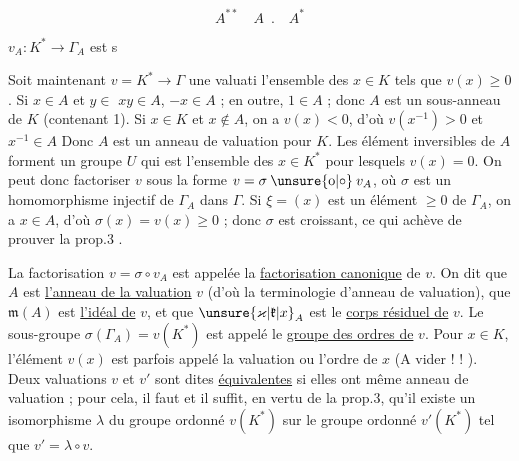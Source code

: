 
\[
A^{**}\quad A\enspace .\quad A^*
\]




$v_A:K^*\longrightarrow\Gamma_A$ est s

Soit maintenant $v=K^*\longrightarrow\Gamma$ une valuati l'ensemble des $x\in K$ tels que $v(x)\geqslant0$. Si $x\in A$ et $y\in$  $xy\in A$, $-x\in A$ ; en outre, $1\in A$ ; donc $A$ est un sous-anneau de $K$ (contenant 1). Si $x\in K$ et $x\notin A$, on a $v(x)<0$, d'où $v(x^{-1})>0$ et $x^{-1}\in A$ Donc $A$ est un anneau de valuation pour $K$. Les élément inversibles de $A$ forment un groupe $U$ qui est l'ensemble des $x\in K^*$ pour lesquels $v(x)=0$. On peut donc factoriser $v$ sous la forme $v=\sigma\mathbin{\unsure{\mathrm{o}|\circ}}v_A$, où $\sigma$ est un homomorphisme injectif de $\Gamma_A$ dans $\Gamma$. Si $\xi=(x)$ est un élément $\geqslant0$ de $\Gamma_A$, on a $x\in A$, d'où $\sigma(x)=v(x)\geqslant0$ ; donc $\sigma$ est croissant, ce qui achève de prouver la prop.3 .

La factorisation $v=\sigma\circ v_A$ est appelée la \uline{factorisation canonique} de $v$. On dit que $A$ est \uline{l'anneau de la valuation} $v$ (d'où la terminologie d'anneau de valuation), que $\mathfrak{m}(A)$ est \uline{l'idéal de} $v$, et que $\unsure{\varkappa|\mathfrak{k}|x}_A$ est le \uline{corps résiduel de} $v$. Le sous-groupe $\sigma(\Gamma_A)=v(K^*)$ est appelé le \uline{groupe des ordres de} $v$. Pour $x\in K$, l'élément $v(x)$ est parfois appelé la valuation ou l'ordre de $x$ (A vider ! ! ). Deux valuations $v$ et $v'$ sont dites \uline{équivalentes} si elles ont même anneau de valuation ; pour cela, il faut et il suffit, en vertu de la prop.3, qu'il existe un isomorphisme $\lambda$ du groupe ordonné $v(K^*)$ sur le groupe ordonné $v'(K^*)$ tel que $v'=\lambda\circ v$.

